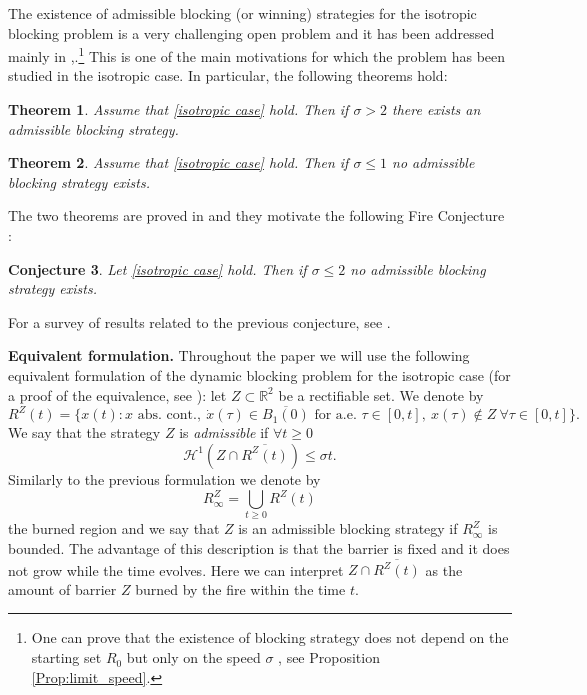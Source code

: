 \documentclass[reqno]{amsart}
\theoremstyle{definition} \newtheorem{definition}{Definition}[section]
\theoremstyle{definition} \newtheorem{remark}[definition]{Remark}
\theoremstyle{plain} \newtheorem{lemma}[definition]{Lemma}
\theoremstyle{plain} \newtheorem{proposition}[definition]{Proposition}
\theoremstyle{plain} \newtheorem{theorem}[definition]{Theorem}
\theoremstyle{plain} \newtheorem{corollary}[definition]{Corollary}
\theoremstyle{definition} \newtheorem{example}[definition]{Example}
\theoremstyle{plain} \newtheorem{claim}[clai]{Claim}
\theoremstyle{definition} \newtheorem{assumption}[definition]{Assumption}
\theoremstyle{definition} \newtheorem{observation}[definition]{Observation}
\newcommand{\R}{\mathbb{R}}
\newcommand{\1}{\mathbbm 1}
\renewcommand{\H}{\mathscr H}
\numberwithin{equation}{section} %
\theoremstyle{plain} \newtheorem*{theorem*}{Theorem}
\theoremstyle{plain} \newtheorem{mthm}[maintheorem]{Main Theorem}
\theoremstyle{plain} \newtheorem*{mthm*}{Main Theorem}
\theoremstyle{plain} \newtheorem*{conjecture*}{Conjecture}
\theoremstyle{plain} \newtheorem{conjecture}[definition]{Conjecture}
\theoremstyle{plain} \newtheorem*{problem*}{Problem}
\begin{document}
The existence of admissible blocking (or winning) strategies for the isotropic blocking problem is a very challenging open problem and it has been addressed mainly in \cite{Bressan_2007},\cite{Bressan_friends}.\footnote{One can prove that the existence of blocking strategy does not depend on the starting set $R_0$ but only on the speed $\sigma$ \cite{Bressan_survey}, see Proposition \ref{Prop:limit_speed}.} This is one of the main motivations for which the problem has been studied in the isotropic case. In particular, the following theorems hold:

\begin{theorem}
\label{thm:existence:2}
Assume that \eqref{isotropic case} hold. Then if $\sigma>2$ there exists an admissible blocking strategy.
\end{theorem}

\begin{theorem}
\label{thm:nonexistence:1}
Assume that \eqref{isotropic case} hold. Then if $\sigma\leq 1$ no admissible blocking strategy exists.
\end{theorem}

 The two theorems are proved in  \cite{Bressan_2007} and they motivate the following Fire Conjecture \cite{Bressan_conj}:
\begin{conjecture}
\label{conj:bressan}
Let \eqref{isotropic case} hold. Then if $\sigma\leq 2$ no admissible blocking strategy exists.
\end{conjecture}
For a survey of results related to the previous conjecture, see \cite{Bressan_survey}.

\medskip

\textbf{Equivalent formulation.} Throughout the paper we will use the following equivalent formulation of the dynamic blocking problem for the isotropic case (for a proof of the equivalence, see \cite{Bressan_equivalent}): let $Z\subset\R^2$ be a rectifiable set. We denote by
\begin{equation}
\label{eq:burned:region_intro}
R^Z(t) = \Big\lbrace  x(t): x\text{ abs. cont.},\ \dot x(\tau) \in \overline{B_1(0)} \text{ for a.e. } \tau \in [0,t],\ x(\tau)\not\in Z \ \forall \tau \in[0,t] \Big\rbrace.
\end{equation}
We say that the strategy $Z$ is \emph{admissible} if $\forall t\geq 0$
\begin{equation*}
\H^1(Z\cap\overline{R^Z(t)})\leq\sigma t.
\end{equation*}
Similarly to the previous formulation we denote by
\begin{equation}
\label{eq:burned:region}
R^Z_\infty = \bigcup_{t\geq 0} R^Z(t)
\end{equation}
the burned region and we say that $Z$ is an admissible blocking strategy if $R^Z_\infty$ is bounded. The advantage of this description is that the barrier is fixed and it does not grow while the time evolves. Here we can interpret $Z \cap \overline{R^Z(t)}$ as the amount of barrier $Z$ burned by the fire within the time $t$.
\end{document}
